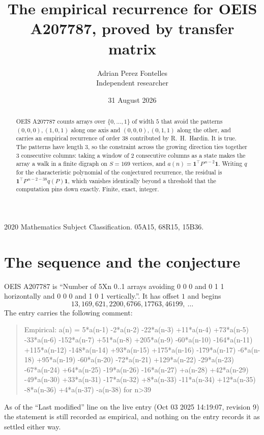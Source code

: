 \documentclass[11pt,a4paper]{article}
\title{The empirical recurrence for OEIS A207787, proved by transfer matrix}
\author{Adrian Perez Fontelles\\ \small Independent researcher}
\date{31 August 2026}
\theoremstyle{plain}
\theoremstyle{definition}
\begin{document}
\maketitle

\begin{abstract}
OEIS A207787 counts arrays over $\{0,\dots,1\}$ of width $5$ that avoid the patterns
$(0,0,0), (1,0,1)$ along one axis and $(0,0,0), (0,1,1)$ along the other, and carries an empirical recurrence of
order $38$ contributed by R.~H.~Hardin. It is true. The patterns have length $3$, so
the constraint across the growing direction ties together $3$ consecutive columns: taking a
window of $2$ consecutive columns as a state makes the array a walk in a finite digraph
on $S=169$ vertices, and $a(n)=\mathbf{1}^{\!\top}P^{\,n-2}\mathbf{1}$. Writing $q$
for the characteristic polynomial of the conjectured recurrence, the residual is
$\mathbf{1}^{\!\top}P^{\,n-2-38}q(P)\mathbf{1}$, which vanishes identically
beyond a threshold that the computation pins down exactly. Finite, exact, integer.
\end{abstract}

\noindent\small 2020 Mathematics Subject Classification. 05A15, 68R15, 15B36.\normalsize

\section{The sequence and the conjecture}

OEIS A207787 is ``Number of 5Xn 0..1 arrays avoiding 0 0 0 and 0 1 1 horizontally and 0 0 0 and 1 0 1 vertically.''. It has offset
$1$ and begins
\[
13, 169, 621, 2200, 6766, 17763, 46199,\ \dots
\]
The entry carries the following comment:
\begin{quote}\small
Empirical: a(n) = 5*a(n-1) -2*a(n-2) -22*a(n-3) +11*a(n-4) +73*a(n-5) -33*a(n-6) -152*a(n-7) +51*a(n-8) +205*a(n-9) -60*a(n-10) -164*a(n-11) +115*a(n-12) -148*a(n-14) +93*a(n-15) +175*a(n-16) -179*a(n-17) -6*a(n-18) +95*a(n-19) -60*a(n-20) -72*a(n-21) +129*a(n-22) -29*a(n-23) -67*a(n-24) +64*a(n-25) -19*a(n-26) -16*a(n-27) +a(n-28) +42*a(n-29) -49*a(n-30) +33*a(n-31) -17*a(n-32) +8*a(n-33) -11*a(n-34) +12*a(n-35) -8*a(n-36) +4*a(n-37) -a(n-38) for n>39
\end{quote}
As of the ``Last modified'' line on the live entry (Oct 03 2025 14:19:07, revision
9) the statement is still recorded as empirical, and nothing on the entry
records it as settled either way.
\end{document}

